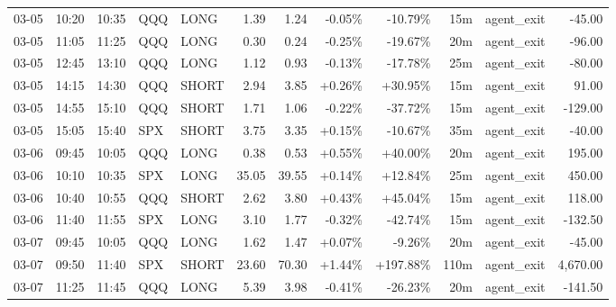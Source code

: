 \documentclass[11pt,a4paper]{article}
\begin{document}
\begin{center}
\begin{longtable}{>{\color{txtmain}}l l l l l r r r r r >{\color{txtmain}}l r}
03-05 & 10:20 & 10:35 & QQQ & LONG & 1.39 & 1.24 & \textcolor{lossred}{-0.05\%} & \textcolor{lossred}{-10.79\%} & 15m & agent\_exit & \textcolor{lossred}{-45.00} \\
03-05 & 11:05 & 11:25 & QQQ & LONG & 0.30 & 0.24 & \textcolor{lossred}{-0.25\%} & \textcolor{lossred}{-19.67\%} & 20m & agent\_exit & \textcolor{lossred}{-96.00} \\
03-05 & 12:45 & 13:10 & QQQ & LONG & 1.12 & 0.93 & \textcolor{lossred}{-0.13\%} & \textcolor{lossred}{-17.78\%} & 25m & agent\_exit & \textcolor{lossred}{-80.00} \\
03-05 & 14:15 & 14:30 & QQQ & SHORT & 2.94 & 3.85 & \textcolor{wingreen}{+0.26\%} & \textcolor{wingreen}{+30.95\%} & 15m & agent\_exit & \textcolor{wingreen}{91.00} \\
03-05 & 14:55 & 15:10 & QQQ & SHORT & 1.71 & 1.06 & \textcolor{lossred}{-0.22\%} & \textcolor{lossred}{-37.72\%} & 15m & agent\_exit & \textcolor{lossred}{-129.00} \\
03-05 & 15:05 & 15:40 & SPX & SHORT & 3.75 & 3.35 & \textcolor{wingreen}{+0.15\%} & \textcolor{lossred}{-10.67\%} & 35m & agent\_exit & \textcolor{lossred}{-40.00} \\
03-06 & 09:45 & 10:05 & QQQ & LONG & 0.38 & 0.53 & \textcolor{wingreen}{+0.55\%} & \textcolor{wingreen}{+40.00\%} & 20m & agent\_exit & \textcolor{wingreen}{195.00} \\
03-06 & 10:10 & 10:35 & SPX & LONG & 35.05 & 39.55 & \textcolor{wingreen}{+0.14\%} & \textcolor{wingreen}{+12.84\%} & 25m & agent\_exit & \textcolor{wingreen}{450.00} \\
03-06 & 10:40 & 10:55 & QQQ & SHORT & 2.62 & 3.80 & \textcolor{wingreen}{+0.43\%} & \textcolor{wingreen}{+45.04\%} & 15m & agent\_exit & \textcolor{wingreen}{118.00} \\
03-06 & 11:40 & 11:55 & SPX & LONG & 3.10 & 1.77 & \textcolor{lossred}{-0.32\%} & \textcolor{lossred}{-42.74\%} & 15m & agent\_exit & \textcolor{lossred}{-132.50} \\
03-07 & 09:45 & 10:05 & QQQ & LONG & 1.62 & 1.47 & \textcolor{wingreen}{+0.07\%} & \textcolor{lossred}{-9.26\%} & 20m & agent\_exit & \textcolor{lossred}{-45.00} \\
03-07 & 09:50 & 11:40 & SPX & SHORT & 23.60 & 70.30 & \textcolor{wingreen}{+1.44\%} & \textcolor{wingreen}{+197.88\%} & 110m & agent\_exit & \textcolor{wingreen}{4,670.00} \\
03-07 & 11:25 & 11:45 & QQQ & LONG & 5.39 & 3.98 & \textcolor{lossred}{-0.41\%} & \textcolor{lossred}{-26.23\%} & 20m & agent\_exit & \textcolor{lossred}{-141.50} \\

\end{longtable}
\end{center}
\end{document}
